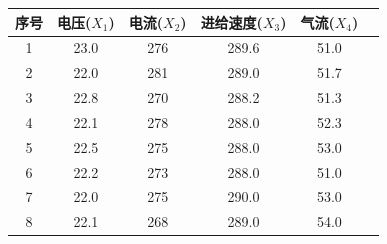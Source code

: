 \begin{mvtable}
\label{tab:5.9}
\begin{tabular}{cccccc}
\toprule
序号 & 电压($X_1$) & 电流($X_2$) & 进给速度($X_3$) & 气流($X_4$)\\
\midrule
1 & 23.0 & 276 & 289.6 & 51.0\\
2 & 22.0 & 281 & 289.0 & 51.7\\
3 & 22.8 & 270 & 288.2 & 51.3\\
4 & 22.1 & 278 & 288.0 & 52.3\\
5 & 22.5 & 275 & 288.0 & 53.0\\
6 & 22.2 & 273 & 288.0 & 51.0\\
7 & 22.0 & 275 & 290.0 & 53.0\\
8 & 22.1 & 268 & 289.0 & 54.0\\
\bottomrule
\end{tabular}
\end{mvtable}
